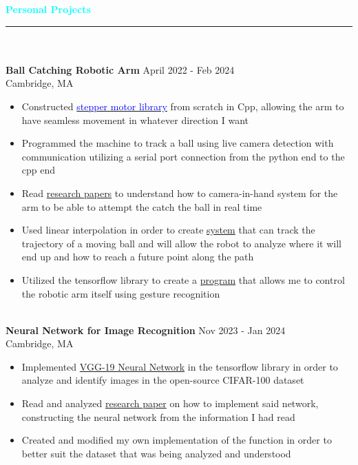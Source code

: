 \documentclass[letterpaper,12pt]{article}
\newcommand{\code}[1]{\fontfamily{lmss}\selectfont #1}
\newcommand*\tick{\item[\faAngleRight]}
\begin{document}
\begin{minipage}{18cm}
    \Large\code{\textcolor{aqua}{\textbf{Personal Projects}}} \textcolor{aqua}{\rule[0.5ex]{16.25cm}{1px}} \\
    \hfill\\ \large\color{black}\code{\textbf{Ball Catching Robotic Arm}} \hfill April 2022 - Feb 2024 \\
     \small  \hfill \normalsize \color{white} Cambridge, MA 
    
    \color{darkgray}\begin{itemize}
        \tick Constructed \href{https://github.com/pyfb78/Robotic-Arm-Ball-Tracker}{\textcolor{blue}{stepper motor library}} from scratch in Cpp, allowing the arm to have seamless movement in whatever direction I want
        \tick Programmed the machine to track a ball using live camera detection with communication utilizing a serial port connection from the python end to the cpp end
        \tick Read \href{http://wpage.unina.it/fabio.ruggiero/Papers/J5.pdf}{\color{blue}research papers} to understand how to camera-in-hand system for the arm to be able to attempt the catch the ball in real time
        \tick Used linear interpolation in order to create \href{https://github.com/pyfb78/Robotic-Arm-Ball-Tracker/blob/main/PythonBallTracking/old_files/ball_trajectory.py}{\color{blue}system} that can track the trajectory of a moving ball and will allow the robot to analyze where it will end up and how to reach a future point along the path
        \tick Utilized the tensorflow library to create a \href{https://github.com/pyfb78/Robotic-Arm-Hand-Gesture-Control}{\color{blue}program} that allows me to control the robotic arm itself using gesture recognition
    \end{itemize}
    
   \hfill\\ \large\color{black}\code{\textbf{Neural Network for Image Recognition}} \hfill Nov 2023 - Jan 2024 \\
     \small  \hfill \normalsize \color{white} Cambridge, MA 
    
    \color{darkgray}\begin{itemize}
        \tick Implemented \href{https://github.com/pyfb78/Image-Recognition/}{\color{blue} VGG-19 Neural Network} in the tensorflow library in order to analyze and identify images in the open-source CIFAR-100 dataset
        \tick Read and analyzed \href{https://arxiv.org/pdf/1409.1556}{\color{blue}research paper} on how to implement said network, constructing the neural network from the information I had read
        \tick Created and modified my own implementation of the \href{https://github.com/pyfb78/Image-Recognition/blob/main/train.py}{\color{blue}{Cross Entropy Loss}} function in order to better suit the dataset that was being analyzed and understood
    \end{itemize}

\end{minipage}
\end{document}
